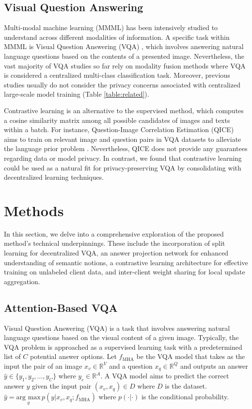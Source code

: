 \documentclass[letterpaper]{article} %
\begin{document}
\subsection{Visual Question Answering}
Multi-modal machine learning (MMML) \cite{mmv,clip,avlnet,dalle,dalle2} has been intensively studied to understand across different modalities of information. A specific task within MMML is Visual Question Answering (VQA) \cite{butd,mmnas}, which involves answering natural language questions based on the contents of a presented image. Nevertheless, the vast majority of VQA studies so far rely on modality fusion methods where VQA is considered a centralized multi-class classification task. Moreover, previous studies usually do not consider the privacy concerns associated with centralized large-scale model training (Table \ref{table:related}).

Contrastive learning is an alternative to the supervised method, which computes a cosine similarity matrix among all possible candidates of images and texts within a batch. For instance, Question-Image Correlation Estimation (QICE) \cite{zhu20} aims to train on relevant image and question pairs in VQA datasets to alleviate the language prior problem \cite{prior2}. Nevertheless, QICE does not provide any guarantees regarding data or model privacy. In contrast, we found that contrastive learning could be used as a natural fit for privacy-preserving VQA by consolidating with decentralized learning techniques.


\section{Methods}

In this section, we delve into a comprehensive exploration of the proposed method's technical underpinnings. These include the incorporation of split learning for decentralized VQA, an answer projection network for enhanced understanding of semantic notions, a contrastive learning architecture for effective training on unlabeled client data, and inter-client weight sharing for local update aggregation.

\subsection{Attention-Based VQA}
Visual Question Answering (VQA) is a task that involves answering natural language questions based on the visual content of a given image. Typically, the VQA problem is approached as a supervised learning task with a predetermined list of $C$ potential answer options. Let $f_{\text{MHA}}$ be the VQA model that takes as the input the pair of an image $x_v\in \mathbb{R}^V$ and a question $x_q\in \mathbb{R}^Q$ and outputs an answer $\hat{y} \in \{y_1,y_2,...,y_C\}$ where $y_c \in \mathbb{R}^A$. A VQA model aims to predict the correct answer $y$ given the input pair $(x_v,x_q) \in D$ where $D$ is the dataset. $\hat{y}=\underset{y}{\mbox{arg max}}\,p(y|x_v,x_q;f_{\text{MHA}})$ where $p(\cdot|\cdot)$ is the conditional probability.
\end{document}
